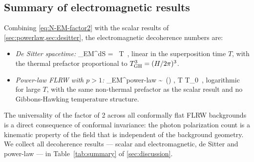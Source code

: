 \subsection{Summary of electromagnetic results}
\label{sec:em-summary}

Combining \cref{eq:N-EM-factor2} with the scalar results of
\cref{sec:powerlaw,sec:desitter}, the electromagnetic decoherence numbers are:

\begin{itemize}[noitemsep]
  \item \emph{De Sitter spacetime:}
  \be
    \Nnum_{\rm EM}^{\rm dS}
    =
    \, T \,,
    \label{eq:N-EM-dS}
  \ee
  linear in the superposition time $T$, with the thermal prefactor
  proportional to $T_{\rm GH}^3 = (H/2\pi)^3$.

  \item \emph{Power-law FLRW with $p > 1$:}
  \be
    \Nnum_{\rm EM}^{\rm power-law}
    \;\sim\;
    \,\ln\!\lb(\rb) ,
    \qquad T \gg T_0 \,,
    \label{eq:N-EM-PL}
  \ee
  logarithmic for large $T$, with the same non-thermal prefactor as the
  scalar result and no Gibbons-Hawking temperature structure.
\end{itemize}

The universality of the factor of 2 across all conformally flat FLRW backgrounds
is a direct consequence of conformal invariance: the photon polarization count
is a kinematic property of the field that is independent of the background
geometry.  We collect all decoherence results — scalar and electromagnetic, de
Sitter and power-law — in Table~\ref{tab:summary} of \cref{sec:discussion}.

